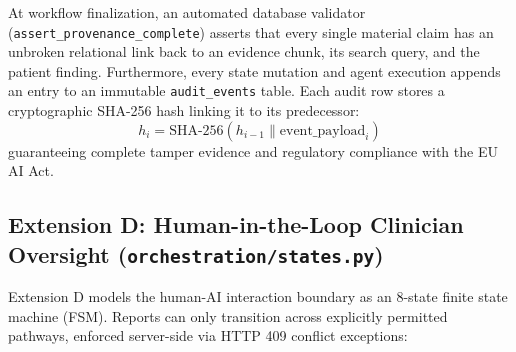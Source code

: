 \documentclass[12pt,a4paper]{report}
\begin{document}
At workflow finalization, an automated database validator (\texttt{assert\_provenance\_complete}) asserts that every single material claim has an unbroken relational link back to an evidence chunk, its search query, and the patient finding. Furthermore, every state mutation and agent execution appends an entry to an immutable \texttt{audit\_events} table. Each audit row stores a cryptographic SHA-256 hash linking it to its predecessor:
\begin{equation}
    h_i = \text{SHA-256}(h_{i-1} \parallel \text{event\_payload}_i)
\end{equation}
guaranteeing complete tamper evidence and regulatory compliance with the EU AI Act.

\subsection{Extension D: Human-in-the-Loop Clinician Oversight (\texttt{orchestration/states.py})}
Extension D models the human-AI interaction boundary as an 8-state finite state machine (FSM). Reports can only transition across explicitly permitted pathways, enforced server-side via HTTP 409 conflict exceptions:
\end{document}
